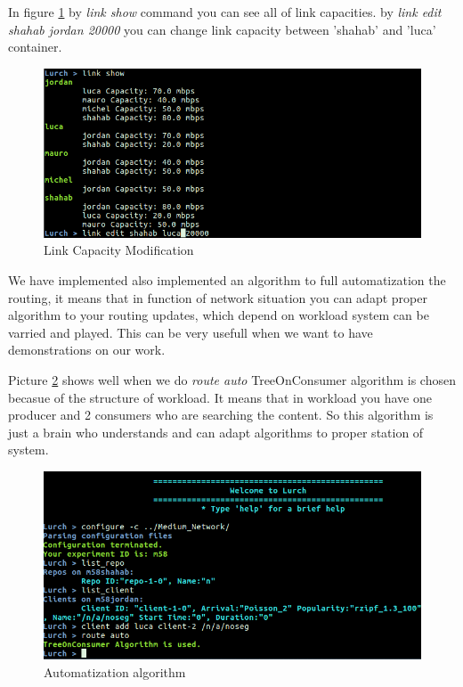 In figure \ref{capacity} by \textit{link show} command you can see all of link capacities. by \textit{link edit shahab jordan 20000} you can change link capacity between 'shahab' and 'luca' container.

\begin{figure}[H]

\begin{center}

\includegraphics[scale = 0.55]{Pictures/capacity.png}

\caption{Link Capacity Modification} \label{capacity} 

\end{center}

\end{figure}
 
We have implemented also implemented an algorithm to full automatization the routing, it means that in function of network situation you can adapt proper algorithm to your routing updates, which depend on workload system can be varried and played. This can be very usefull when we want to have demonstrations on our work.

Picture \ref{auto} shows well when we do \textit{route auto} TreeOnConsumer algorithm is chosen becasue of the structure of workload. It means that in workload you have one producer and 2 consumers who are searching the content. So this algorithm is just a brain who understands and can adapt algorithms to proper station of system.

\begin{figure}[H]

\begin{center}

\includegraphics[scale = 0.35]{Pictures/auto.png}

\caption{Automatization algorithm} \label{auto} 

\end{center}

\end{figure}



